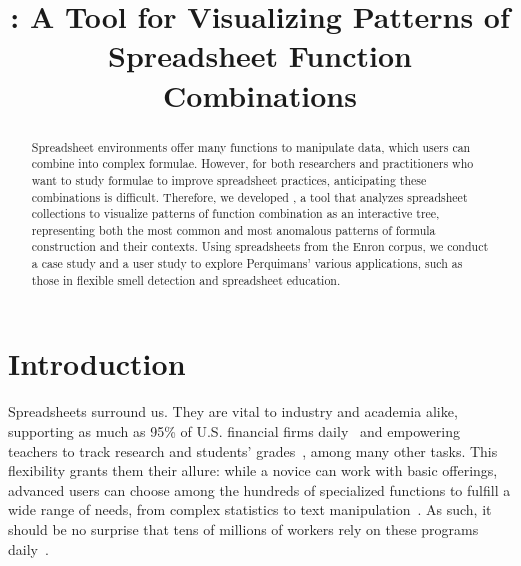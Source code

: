 \documentclass[conference]{IEEEtran}
\newcommand{\toolnameposs}{Perquimans' }
\begin{document}
 \title{\toolnameend: A Tool for Visualizing Patterns of
		Spreadsheet Function Combinations}
	
	
	\author{ 
		}
	
	
	\maketitle
	
	\begin{abstract} Spreadsheet environments offer many
		functions to manipulate data, which users can combine into
		complex formulae. However, for both researchers and practitioners who want to
		study formulae to improve spreadsheet practices, anticipating these
		combinations is difficult. Therefore, we developed \toolnameend, a tool that
		analyzes spreadsheet collections to visualize patterns of function combination
		as an interactive tree, representing both the most common and most anomalous
		patterns of formula construction and their contexts. Using spreadsheets from
		the Enron corpus, we conduct a case study and a user study to explore
		\toolnameposs various applications, such as those in flexible smell
		detection and spreadsheet education.
		
	\end{abstract}
	
	\section{Introduction} Spreadsheets surround us. They are vital to
	industry and academia alike, supporting as much as 95\% of U.S. financial firms
	daily~\cite{panko2008sarbanes} and empowering teachers to track research and
	students' grades~\cite{ko2011state}, among many other tasks. This flexibility
	grants them their allure: while a novice can work with basic offerings, advanced
	users can choose among the hundreds of specialized functions to fulfill a wide
	range of needs, from complex statistics to text
	manipulation~\cite{nardi1990spreadsheet}. As such, it should be no surprise
	that tens of millions of workers rely on these
	programs daily~\cite{scaffidi2005estimating}.
	
\end{document}
